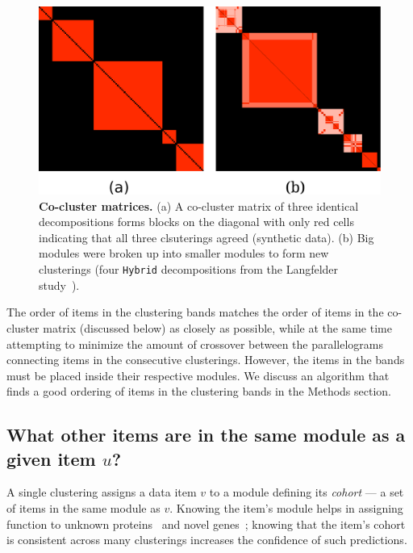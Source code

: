\documentclass[12pt]{cmuthesis}
\begin{document}
  \begin{figure}[ht]
    \centering
    \includegraphics[width=0.7\linewidth]{figures/coral_matrices}
    \caption{\textbf{Co-cluster matrices.} (a) A co-cluster matrix of three identical decompositions forms blocks on
    the diagonal with only red cells indicating that all three clsuterings agreed
    (synthetic data). (b) Big modules were broken up into smaller modules to form
    new clusterings (four \texttt{Hybrid} decompositions from the Langfelder
    study~\cite{Langfelder2008}).}
    \label{fig:coral:matrices}
  \end{figure}

  The order of items in the clustering bands matches the order of items in the
  co-cluster matrix (discussed below) as closely as possible, while at the same
  time attempting to minimize the amount of crossover between the parallelograms
  connecting items in the consecutive clusterings. However, the items in the bands
  must be placed inside their respective modules. We
  discuss an algorithm that finds a good ordering of items in the
  clustering bands in the Methods section.


  \newcommand{\Mplus}{$A^{+}$~}

  \subsection{What other items are in the same module as a given item $u$?}

  A single clustering assigns a data item $v$ to a module defining its \textit{cohort} --- a set of items in the same module as $v$. Knowing the item's module helps in assigning function to unknown proteins~\cite{Bader2003} and novel genes~\cite{Ulitsky2010}; knowing that the item's cohort is consistent across many clusterings increases the confidence of such predictions.
\end{document}
